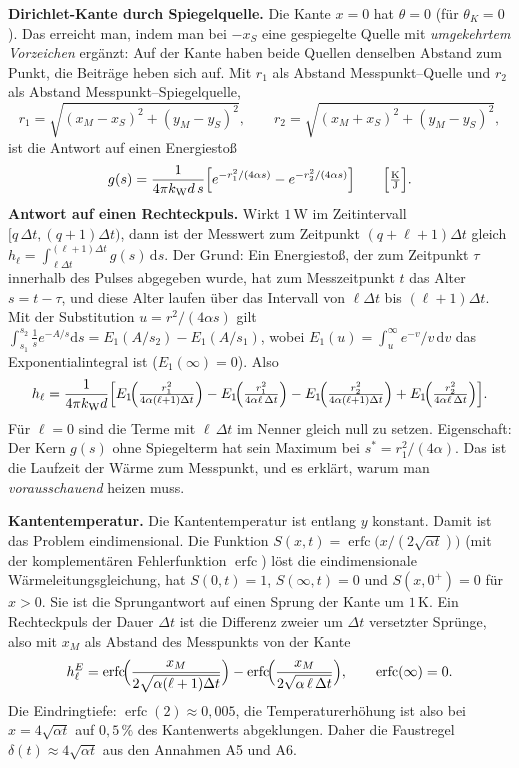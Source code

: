 \documentclass[11pt,a4paper]{article}
\numberwithin{equation}{section}
\newcommand{\dd}{\mathrm{d}}
\newcommand{\dt}{\Delta t}
\newcommand{\kW}{k_{\mathrm W}}
\newcommand{\thK}{\theta_{K}}
\begin{document}
\textbf{Dirichlet-Kante durch Spiegelquelle.} Die Kante $x=0$ hat $\theta=0$ (für $\thK=0$). Das erreicht man, indem man bei $-x_S$ eine gespiegelte Quelle mit \emph{umgekehrtem Vorzeichen} ergänzt: Auf der Kante haben beide Quellen denselben Abstand zum Punkt, die Beiträge heben sich auf. Mit $r_1$ als Abstand Messpunkt--Quelle und $r_2$ als Abstand Messpunkt--Spiegelquelle,
\begin{equation}
 r_1=\sqrt{(x_M-x_S)^2+(y_M-y_S)^2},\qquad r_2=\sqrt{(x_M+x_S)^2+(y_M-y_S)^2},
\end{equation}
ist die Antwort auf einen Energiestoß
\begin{equation}
 g(s)=\frac{1}{4\pi\kW d\,s}\Bigl[e^{-r_1^2/(4\alpha s)}-e^{-r_2^2/(4\alpha s)}\Bigr]\qquad\Bigl[\tfrac{\mathrm K}{\mathrm J}\Bigr].
\end{equation}
\textbf{Antwort auf einen Rechteckpuls.} Wirkt $1$\,W im Zeitintervall $[q\,\dt,(q+1)\dt)$, dann ist der Messwert zum Zeitpunkt $(q+\ell+1)\dt$ gleich $h_\ell=\int_{\ell\dt}^{(\ell+1)\dt}g(s)\,\dd s$. Der Grund: Ein Energiestoß, der zum Zeitpunkt $\tau$ innerhalb des Pulses abgegeben wurde, hat zum Messzeitpunkt $t$ das Alter $s=t-\tau$, und diese Alter laufen über das Intervall von $\ell\dt$ bis $(\ell+1)\dt$. Mit der Substitution $u=r^2/(4\alpha s)$ gilt $\int_{s_1}^{s_2}\tfrac{1}{s}e^{-A/s}\dd s=E_1(A/s_2)-E_1(A/s_1)$, wobei $E_1(u)=\int_u^\infty e^{-v}/v\,\dd v$ das Exponentialintegral ist ($E_1(\infty)=0$). Also
\begin{equation}
 h_\ell=\frac{1}{4\pi\kW d}\Bigl[E_1\!\Bigl(\tfrac{r_1^2}{4\alpha(\ell+1)\dt}\Bigr)-E_1\!\Bigl(\tfrac{r_1^2}{4\alpha\ell\,\dt}\Bigr)-E_1\!\Bigl(\tfrac{r_2^2}{4\alpha(\ell+1)\dt}\Bigr)+E_1\!\Bigl(\tfrac{r_2^2}{4\alpha\ell\,\dt}\Bigr)\Bigr].
 \label{eq:h_analytisch}
\end{equation}
Für $\ell=0$ sind die Terme mit $\ell\,\dt$ im Nenner gleich null zu setzen. Eigenschaft: Der Kern $g(s)$ ohne Spiegelterm hat sein Maximum bei $s^*=r_1^2/(4\alpha)$. Das ist die Laufzeit der Wärme zum Messpunkt, und es erklärt, warum man \emph{vorausschauend} heizen muss.

\textbf{Kantentemperatur.} Die Kantentemperatur ist entlang $y$ konstant. Damit ist das Problem eindimensional. Die Funktion $S(x,t)=\operatorname{erfc}\!\bigl(x/(2\sqrt{\alpha t})\bigr)$ (mit der komplementären Fehlerfunktion $\operatorname{erfc}$) löst die eindimensionale Wärmeleitungsgleichung, hat $S(0,t)=1$, $S(\infty,t)=0$ und $S(x,0^+)=0$ für $x>0$. Sie ist die Sprungantwort auf einen Sprung der Kante um $1$\,K. Ein Rechteckpuls der Dauer $\dt$ ist die Differenz zweier um $\dt$ versetzter Sprünge, also mit $x_M$ als Abstand des Messpunkts von der Kante
\begin{equation}
 h^E_\ell=\operatorname{erfc}\!\Bigl(\frac{x_M}{2\sqrt{\alpha(\ell+1)\dt}}\Bigr)-\operatorname{erfc}\!\Bigl(\frac{x_M}{2\sqrt{\alpha\,\ell\,\dt}}\Bigr),\qquad \operatorname{erfc}(\infty)=0.
 \label{eq:hE_analytisch}
\end{equation}
Die Eindringtiefe: $\operatorname{erfc}(2)\approx0{,}005$, die Temperaturerhöhung ist also bei $x=4\sqrt{\alpha t}$ auf $0{,}5\,\%$ des Kantenwerts abgeklungen. Daher die Faustregel $\delta(t)\approx4\sqrt{\alpha t}$ aus den Annahmen A5 und A6.
\end{document}
